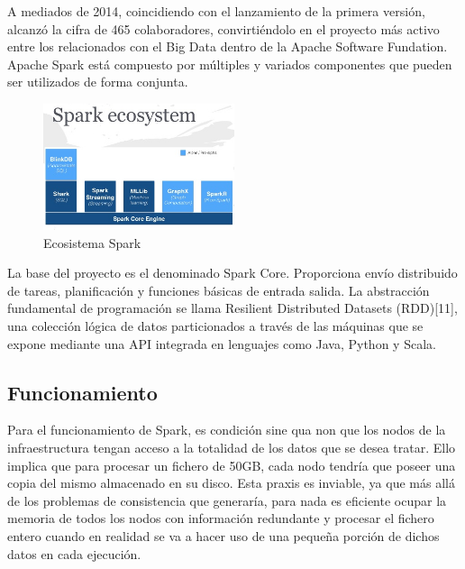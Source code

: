 A mediados de 2014, coincidiendo con el lanzamiento de la primera versión, alcanzó la cifra de 465 colaboradores, convirtiéndolo en el proyecto más activo entre los relacionados con el Big Data dentro de la Apache Software Fundation.\\

Apache Spark está compuesto por múltiples y variados componentes que pueden ser utilizados de forma conjunta.\\

\begin{figure}[h]
	\centering
	\includegraphics[width=0.5\textwidth]{Ilustraciones/spark_ecosystem.png}
	\caption{Ecosistema Spark}
	\label{fig:ipanel}
\end{figure}

La base del proyecto es el denominado Spark Core. Proporciona envío distribuido de tareas, planificación y funciones básicas de entrada salida. La abstracción fundamental de programación se llama Resilient Distributed Datasets (RDD)[11], una colección lógica de datos particionados a través de las máquinas que se expone mediante una API integrada en lenguajes como Java, Python y Scala.\\

\subsection{Funcionamiento}

Para el funcionamiento de Spark, es condición sine qua non que los nodos de la infraestructura tengan acceso a la totalidad de los datos que se desea tratar. Ello implica que para procesar un fichero de 50GB, cada nodo tendría que poseer una copia del mismo almacenado en su disco. Esta praxis es inviable, ya que más allá de los problemas de consistencia que generaría, para nada es eficiente ocupar la memoria de todos los nodos con información redundante y procesar el fichero entero cuando en realidad se va a hacer uso de una pequeña porción de dichos datos en cada ejecución.\\

